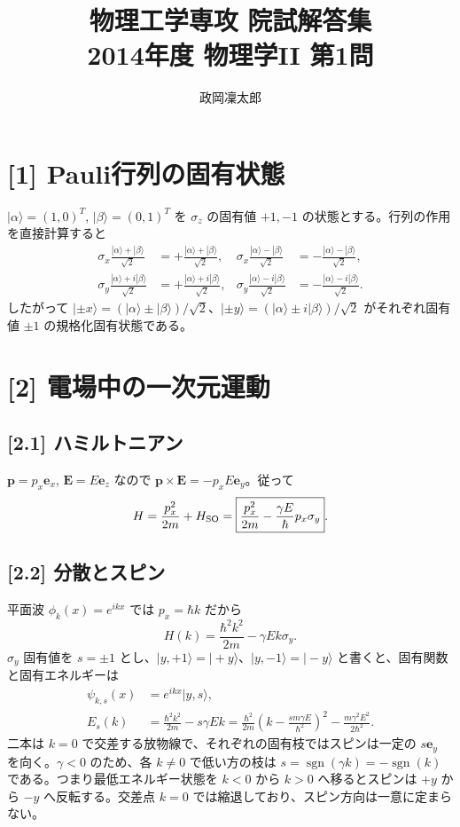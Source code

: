 \documentclass[11pt,a4paper]{article}
\title{物理工学専攻 院試解答集\\2014年度 物理学II 第1問}
\author{政岡凜太郎}
\date{}
\begin{document}
\maketitle

\section*{[1] Pauli行列の固有状態}
$|\alpha\rangle=(1,0)^T$, $|\beta\rangle=(0,1)^T$ を $\sigma_z$ の固有値 $+1,-1$ の状態とする。行列の作用を直接計算すると
\begin{align}
 \sigma_x\frac{|\alpha\rangle+|\beta\rangle}{\sqrt2}
 &=+\frac{|\alpha\rangle+|\beta\rangle}{\sqrt2},&
 \sigma_x\frac{|\alpha\rangle-|\beta\rangle}{\sqrt2}
 &=-\frac{|\alpha\rangle-|\beta\rangle}{\sqrt2},\\
 \sigma_y\frac{|\alpha\rangle+i|\beta\rangle}{\sqrt2}
 &=+\frac{|\alpha\rangle+i|\beta\rangle}{\sqrt2},&
 \sigma_y\frac{|\alpha\rangle-i|\beta\rangle}{\sqrt2}
 &=-\frac{|\alpha\rangle-i|\beta\rangle}{\sqrt2}.
\end{align}
したがって $|\pm x\rangle=(|\alpha\rangle\pm|\beta\rangle)/\sqrt2$、$|\pm y\rangle=(|\alpha\rangle\pm i|\beta\rangle)/\sqrt2$ がそれぞれ固有値 $\pm1$ の規格化固有状態である。

\section*{[2] 電場中の一次元運動}
\subsection*{[2.1] ハミルトニアン}
$\boldsymbol p=p_x\boldsymbol e_x$, $\boldsymbol E=E\boldsymbol e_z$ なので $\boldsymbol p\times\boldsymbol E=-p_xE\boldsymbol e_y$。従って
\begin{equation}
 H=\frac{p_x^2}{2m}+H_{\rm SO}
 =\boxed{\frac{p_x^2}{2m}-\frac{\gamma E}{\hbar}p_x\sigma_y}.
\end{equation}

\subsection*{[2.2] 分散とスピン}
平面波 $\phi_k(x)=e^{ikx}$ では $p_x=\hbar k$ だから
\begin{equation}
 H(k)=\frac{\hbar^2k^2}{2m}-\gamma Ek\sigma_y.
\end{equation}
$\sigma_y$ 固有値を $s=\pm1$ とし、$|y,+1\rangle=|+y\rangle$、$|y,-1\rangle=|-y\rangle$ と書くと、固有関数と固有エネルギーは
\begin{align}
 \psi_{k,s}(x)&=e^{ikx}|y,s\rangle,\\
 E_s(k)&=\frac{\hbar^2k^2}{2m}-s\gamma Ek
 =\frac{\hbar^2}{2m}\left(k-\frac{sm\gamma E}{\hbar^2}\right)^2
  -\frac{m\gamma^2E^2}{2\hbar^2}.
\end{align}
二本は $k=0$ で交差する放物線で、それぞれの固有枝ではスピンは一定の $s\boldsymbol e_y$ を向く。$\gamma<0$ のため、各 $k\ne0$ で低い方の枝は $s=\operatorname{sgn}(\gamma k)=-\operatorname{sgn}(k)$ である。つまり最低エネルギー状態を $k<0$ から $k>0$ へ移るとスピンは $+y$ から $-y$ へ反転する。交差点 $k=0$ では縮退しており、スピン方向は一意に定まらない。
\end{document}
